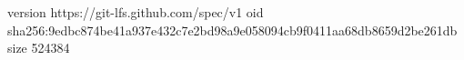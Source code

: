 version https://git-lfs.github.com/spec/v1
oid sha256:9edbc874be41a937e432c7e2bd98a9e058094cb9f0411aa68db8659d2be261db
size 524384
